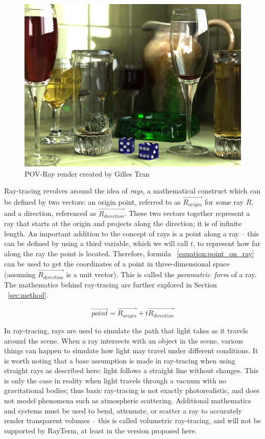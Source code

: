 \documentclass[11pt]{article}
\newcommand{\name}{{\sc RayTerm}}
\newcommand{\rayorg}{\vec{R_{origin}}}
\newcommand{\raydir}{\vec{R_{direction}}}
\begin{document}
\begin{figure}[htb]
  \centering
  \includegraphics[width=\textwidth]{resources/glasses_povray}
  \caption{POV-Ray render created by Gilles Tran \cite{povray2006render}}
  \label{fig:povray_render}
\end{figure}


Ray-tracing revolves around the idea of {\it rays}, a mathematical construct which can be defined by two vectors: an origin point, referred to as $\rayorg$ for some ray $R$, and a direction, referenced as $\raydir$.
These two vectors together represent a ray that starts at the origin and projects along the direction; it is of infinite length.
An important addition to the concept of rays is a point along a ray -- this can be defined by using a third variable, which we will call $t$, to represent how far along the ray the point is located.
Therefore, formula ~\ref{equation:point_on_ray} can be used to get the coordinates of a point in three-dimensional space (assuming $\raydir$ is a unit vector).
This is called the {\it paramatric~form} of a ray.
The mathematics behind ray-tracing are further explored in Section ~\ref{sec:method}.

\begin{equation}
  \label{equation:point_on_ray}
  \vec{point} = \rayorg + t\raydir
\end{equation}

In ray-tracing, rays are used to simulate the path that light takes as it travels around the scene.
When a ray intersects with an object in the scene, various things can happen to simulate how light may travel under different conditions.
It is worth noting that a base assumption is made in ray-tracing when using straight rays as described here: light follows a straight line without changes.
This is only the case in reality when light travels through a vacuum with no gravitational bodies; thus basic ray-tracing is not exactly photorealistic, and does not model phenomena such as atmospheric scattering.
Additional mathematics and systems must be used to bend, attenuate, or scatter a ray to accurately render transparent volumes -- this is called volumetric ray-tracing, and will not be supported by \name, at least in the version proposed here.
\end{document}
